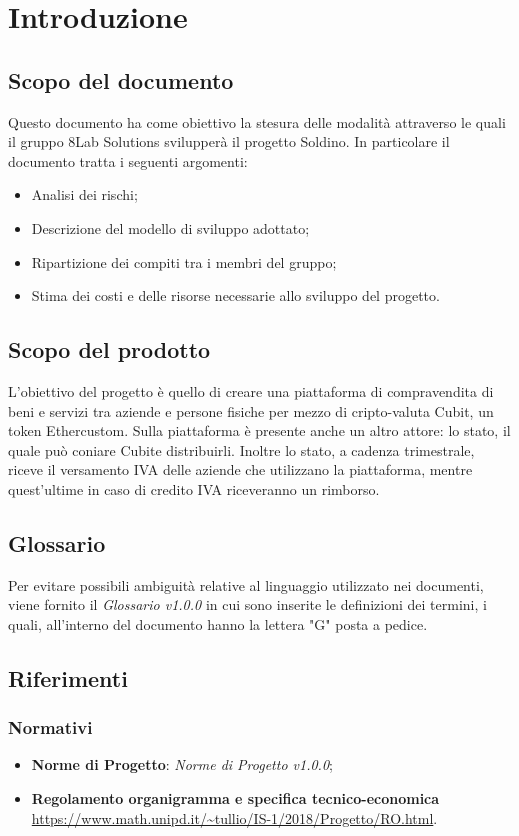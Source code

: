 \section{Introduzione}
\subsection{Scopo del documento}
Questo documento ha come obiettivo la stesura delle modalità attraverso le quali il gruppo 8Lab Solutions svilupperà il progetto Soldino. In particolare il documento tratta i seguenti argomenti:
\begin{itemize}
	\item Analisi dei rischi;
	\item Descrizione del modello di sviluppo adottato;
	\item Ripartizione dei compiti tra i membri del gruppo;
	\item Stima dei costi e delle risorse necessarie allo sviluppo del progetto.
\end{itemize}
\subsection{Scopo del prodotto}
L'obiettivo del progetto è quello di creare una piattaforma di compravendita di beni e servizi tra aziende e persone fisiche per mezzo di cripto-valuta Cubit\glo, un token Ether\glosp custom. Sulla piattaforma è presente anche un altro attore: lo stato, il quale può coniare Cubit\glosp e distribuirli. Inoltre lo stato, a cadenza trimestrale, riceve il versamento IVA delle aziende che utilizzano la piattaforma, mentre quest'ultime in caso di credito IVA riceveranno un rimborso.
\subsection{Glossario}
Per evitare possibili ambiguità relative al linguaggio utilizzato nei 
documenti, viene fornito il \textit{Glossario v1.0.0} in cui sono inserite le 
definizioni dei termini, i quali, all'interno del documento hanno la lettera "G" 
posta a pedice.
\subsection{Riferimenti}
\subsubsection{Normativi}
\begin{itemize}
	\item \textbf{Norme di Progetto}: \textit{Norme di Progetto v1.0.0};
	\item \textbf{Regolamento organigramma e specifica tecnico-economica} \\
	\url{https://www.math.unipd.it/~tullio/IS-1/2018/Progetto/RO.html}.
\end{itemize}

